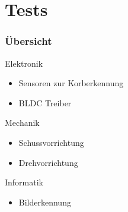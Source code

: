 \section{Tests} %
\begin{frame}
    \frametitle{Übersicht}
    \pause
    \begin{block}{Elektronik}
        \begin{itemize}
            \item Sensoren zur Korberkennung
            \item BLDC Treiber
        \end{itemize}
    \end{block}
    \pause
    \begin{block}{Mechanik}
        \begin{itemize}
            \item Schussvorrichtung
            \item Drehvorrichtung
        \end{itemize}
    \end{block}
    \pause
    \begin{block}{Informatik}
        \begin{itemize}
            \item Bilderkennung
        \end{itemize}
    \end{block}
\end{frame}

